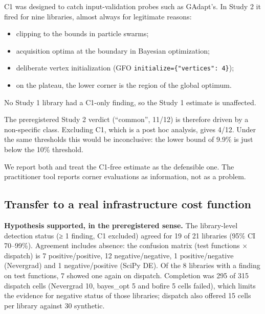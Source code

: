 \documentclass[acmsmall,screen,review,anonymous=false]{acmart}
\providecommand{\tightlist}{\setlength{\itemsep}{0pt}\setlength{\parskip}{0pt}}
\begin{document}
C1 was designed to catch input-validation probes such as GAdapt's. In Study 2 it fired for nine libraries, almost
always for legitimate reasons:

\begin{itemize}
\tightlist
\item
  clipping to the bounds in particle swarms;
\item
  acquisition optima at the boundary in Bayesian optimization;
\item
  deliberate vertex initialization (GFO \texttt{initialize=\{"vertices":\ 4\}});
\item
  on the plateau, the lower corner is the region of the global optimum.
\end{itemize}

No Study 1 library had a C1-only finding, so the Study 1 estimate is unaffected.

The preregistered Study 2 verdict (``common'', 11/12) is therefore driven by a non-specific class. Excluding C1, which
is a post hoc analysis, gives 4/12. Under the same thresholds this would be inconclusive: the lower bound of 9.9\% is
just below the 10\% threshold.

We report both and treat the C1-free estimate as the defensible one. The practitioner tool reports corner
evaluations as information, not as a problem.

\subsection{Transfer to a real infrastructure cost function}\label{transfer-to-a-real-infrastructure-cost-function}

\textbf{Hypothesis supported, in the preregistered sense.} The library-level detection status (≥ 1 finding, C1 excluded)
agreed for 19 of 21 libraries (95\% CI 70--99\%). Agreement includes absence: the confusion matrix (test functions ×
dispatch) is 7 positive/positive, 12 negative/negative, 1 positive/negative (Nevergrad) and 1 negative/positive
(SciPy DE). Of the 8 libraries with a finding on test functions, 7 showed one again on dispatch. Completion was
295 of 315 dispatch cells (Nevergrad 10, bayes\_opt 5 and bofire 5 cells failed), which limits the evidence for
negative status of those libraries; dispatch also offered 15 cells per library against 30 synthetic.
\end{document}
